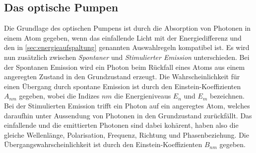 \subsection{Das optische Pumpen}

    Die Grundlage des optischen Pumpens ist durch die Absorption von Photonen in einem Atom gegeben,
    wenn das einfallende Licht mit der Energiedifferenz und den in \autoref{sec:energieaufspaltung} genannten Auswahlregeln kompatibel ist.
    Es wird nun zusätzlich zwischen \textit{Spontaner} und \textit{Stimulierter Emission} unterschieden.
    Bei der Spontanen Emission wird ein Photon beim Rückfall eines Atoms aus einem angeregten Zustand in den Grundzustand erzeugt.
    Die Wahrscheinlichkeit für einen Übergang durch spontane Emission ist durch den Einstein-Koeffizienten $A_{nm}$ gegeben,
    wobei die Indizes $nm$ die Energieniveaus $E_n$ und $E_m$ bezeichnen.
    Bei der Stimulierten Emission trifft ein Photon auf ein angeregtes Atom,
    welches daraufhin unter Aussendung von Photonen in den Grundzustand zurückfällt.
    Das einfallende und die emittierten Photonen sind dabei kohärent,
    haben also die gleiche Wellenlänge, Polarisation, Frequenz, Richtung und Phasenbeziehung.
    Die Übergangswahrscheinlichkeit ist durch den Einstein-Koeffizienten $B_{nm}$ gegeben.


